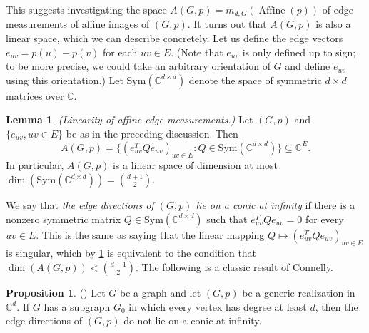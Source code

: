 \documentclass[11pt,a4paper,dvipsnames]{scrartcl}
\theoremstyle{definition}
\newtheorem{lemma}[theorem]{Lemma}
\newtheorem{proposition}[theorem]{Proposition}
\newcommand{\CC}{\mathbb{C}}
\newcommand{\sym}[1]{\text{Sym}(\CC^{#1 \times #1})}
\newcommand{\affineedge}[2]{A(#1,#2)}
\DeclareMathOperator{\aff}{Affine}
\newcommand{\affine}[2]{\aff(#2)}
\begin{document}
This suggests investigating the space $\affineedge{G}{p} = m_{d,G}(\affine{G}{p})$  of edge measurements of affine images of $(G,p)$. It turns out that $\affineedge{G}{p}$ is also a linear space, which we can describe concretely. Let us define the edge vectors $e_{uv} = p(u) - p(v)$ for each $uv \in E$. (Note that $e_{uv}$ is only defined up to sign; to be more precise, we could take an arbitrary orientation of $G$ and define $e_{uv}$ using this orientation.) Let $\sym{d}$ denote the space of symmetric $d \times d$ matrices over $\CC$.
\begin{lemma}\label{lemma:affineedgedim}\cite[Lemma 4.6]{gortler.etal_2019} \emph{(Linearity of affine edge measurements.)}\newline
    Let $(G,p)$ and $\{e_{uv}, uv \in E\}$ be as in the preceding discussion. Then
    \[\affineedge{G}{p} = \{{(e_{uv}^TQe_{uv})}_{uv \in E} : Q \in \sym{d}\} \subseteq \CC^E.\]In particular, $\affineedge{G}{p}$ is a linear space of dimension at most $\dim(\sym{d}) = \binom{d+1}{2}$.
\end{lemma}
We say that \emph{the edge directions of $(G,p)$ lie on a conic at infinity} if there is a nonzero symmetric matrix $Q \in \sym{d}$ such that $e_{uv}^TQe_{uv} = 0$ for every $uv \in E$. This is the same as saying that the linear mapping $Q \mapsto {(e_{uv}^T Q e_{uv})}_{uv \in E}$ is singular, which by \cref{lemma:affineedgedim} is equivalent to the condition that $\dim(\affineedge{G}{p}) < \binom{d+1}{2}$. The following is a classic result of Connelly. %
\begin{proposition}\label{theorem:conicatinfinity} (\cite[Proposition 4.3]{connelly_2005})
    Let $G$ be a graph and let $(G,p)$ be a generic realization in $\CC^d$. If $G$ has a subgraph $G_0$ in which every vertex has degree at least $d$, then the edge directions of $(G,p)$ do not lie on a conic at infinity.
\end{proposition}
\end{document}
